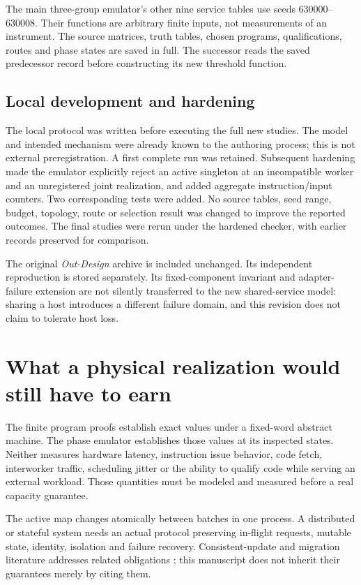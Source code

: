 \documentclass[11pt,letterpaper]{article}
\theoremstyle{definition}\newtheorem{definition}[theorem]{Definition}
\theoremstyle{remark}\newtheorem{remark}[theorem]{Remark}
\begin{document}
The main three-group emulator's other nine service tables use seeds 630000--630008. Their functions are arbitrary finite inputs, not measurements of an instrument. The source matrices, truth tables, chosen programs, qualifications, routes and phase states are saved in full. The successor reads the saved predecessor record before constructing its new threshold function.

\subsection{Local development and hardening}
The local protocol was written before executing the full new studies. The model and intended mechanism were already known to the authoring process; this is not external preregistration. A first complete run was retained. Subsequent hardening made the emulator explicitly reject an active singleton at an incompatible worker and an unregistered joint realization, and added aggregate instruction/input counters. Two corresponding tests were added. No source tables, seed range, budget, topology, route or selection result was changed to improve the reported outcomes. The final studies were rerun under the hardened checker, with earlier records preserved for comparison.

The original \emph{Out-Design} archive is included unchanged. Its independent reproduction is stored separately. Its fixed-component invariant and adapter-failure extension are not silently transferred to the new shared-service model: sharing a host introduces a different failure domain, and this revision does not claim to tolerate host loss.

\section{What a physical realization would still have to earn}
\label{app:physical}
The finite program proofs establish exact values under a fixed-word abstract machine. The phase emulator establishes those values at its inspected states. Neither measures hardware latency, instruction issue behavior, code fetch, interworker traffic, scheduling jitter or the ability to qualify code while serving an external workload. Those quantities must be modeled and measured before a real capacity guarantee.

The active map changes atomically between batches in one process. A distributed or stateful system needs an actual protocol preserving in-flight requests, mutable state, identity, isolation and failure recovery. Consistent-update and migration literature addresses related obligations \citep{reitblatt,ferdaus}; this manuscript does not inherit their guarantees merely by citing them.
\end{document}
